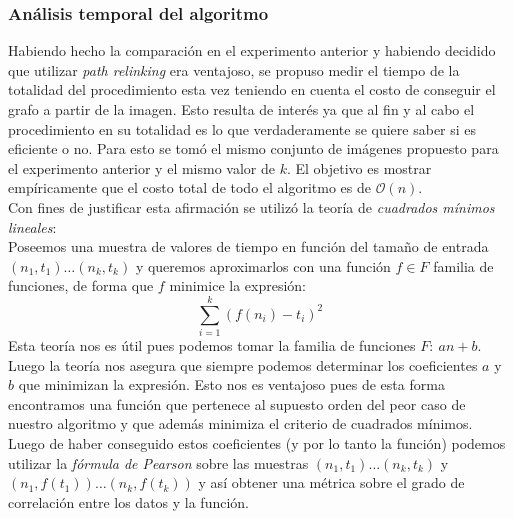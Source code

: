 \subsubsection{An\'alisis temporal del algoritmo}
Habiendo hecho la comparaci\'on en el experimento anterior y habiendo decidido que utilizar \textit{path relinking} era ventajoso, se propuso medir el tiempo de la totalidad del procedimiento esta vez teniendo en cuenta el costo de conseguir el grafo a partir de la imagen. Esto resulta de interés ya que al fin y al cabo el procedimiento en su totalidad es lo que verdaderamente se quiere saber si es eficiente o no. Para esto se tomó el mismo conjunto de im\'agenes propuesto para el experimento anterior y el mismo valor de $k$. El objetivo es mostrar empíricamente que el costo total de todo el algoritmo es de $\mathcal{O}(n)$. \\
\indent Con fines de justificar esta afirmaci\'on se utiliz\'o la teor\'ia de \textit{cuadrados m\'inimos lineales}:\\
\indent Poseemos una muestra de valores de tiempo en funci\'on del tama\~no de entrada $(n_1, t_1) \dots (n_k, t_k)$ y queremos aproximarlos con una funci\'on $f \in F$ familia de funciones, de forma que $f$ minimice la expresión: 
\[
	\sum_{i=1}^k(f(n_i)-t_i)^2
\]
Esta teor\'ia nos es útil pues podemos tomar la familia de funciones $F: \ an+b$. Luego la teor\'ia nos asegura que siempre podemos determinar los coeficientes $a$ y $b$ que minimizan la expresi\'on. Esto nos es ventajoso pues de esta forma encontramos una funci\'on que pertenece al supuesto orden del peor caso de nuestro algoritmo y que además minimiza el criterio de cuadrados m\'inimos.  
Luego de haber conseguido estos coeficientes (y por lo tanto la funci\'on) podemos utilizar la \textit{fórmula de Pearson} sobre las muestras $(n_1, t_1) \dots (n_k, t_k)$ y $(n_1, f(t_1)) \dots (n_k, f(t_k))$ y as\'i obtener una m\'etrica sobre el grado de correlaci\'on entre los datos y la funci\'on. 
